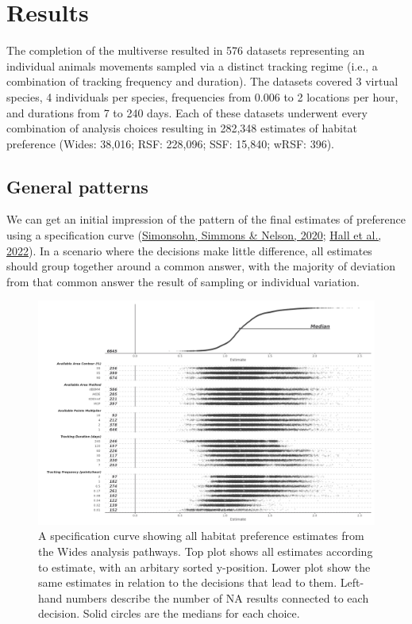 \documentclass[10pt,a4paper]{article}
\begin{document}
\hypertarget{results}{%
\section{Results}\label{results}}

The completion of the multiverse resulted in 576 datasets representing an individual animals movements sampled via a distinct tracking regime (i.e., a combination of tracking frequency and duration).
The datasets covered 3 virtual species, 4 individuals per species, frequencies from 0.006 to 2 locations per hour, and durations from 7 to 240 days.
Each of these datasets underwent every combination of analysis choices resulting in
282,348 estimates of habitat preference (Wides: 38,016; RSF: 228,096; SSF: 15,840; wRSF: 396).

\hypertarget{general-patterns}{%
\subsection{General patterns}\label{general-patterns}}

We can get an initial impression of the pattern of the final estimates of preference using a specification curve (\protect\hyperlink{ref-simonsohn_specification_2020}{Simonsohn, Simmons \& Nelson, 2020}; \protect\hyperlink{ref-hall_survey_2022}{Hall et al., 2022}).
In a scenario where the decisions make little difference, all estimates should group together around a common answer, with the majority of deviation from that common answer the result of sampling or individual variation.

\begin{figure}
\includegraphics[width=1\linewidth]{../figures/widesSpecCurve} \caption{A specification curve showing all habitat preference estimates from the Wides analysis pathways. Top plot shows all estimates according to estimate, with an arbitary sorted y-position. Lower plot show the same estimates in relation to the decisions that lead to them. Left-hand numbers describe the number of NA results connected to each decision. Solid circles are the medians for each choice.}\label{fig:specCurveWides}
\end{figure}
\end{document}
